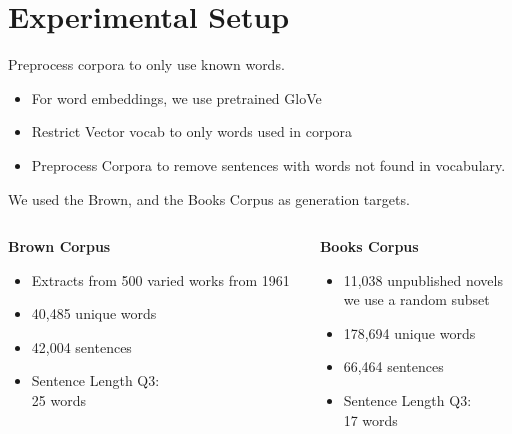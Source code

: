 \documentclass[]{beamer}
\begin{document}
\section{Experimental Setup}

\begin{frame}{Preprocess corpora to only use known words.}
	\begin{itemize}
		\item<1-> For word embeddings, we use pretrained GloVe 
		\item<2-> Restrict Vector vocab to only words used in corpora
		\item<2-> Preprocess Corpora to remove sentences with words not found in vocabulary.
	\end{itemize}
\end{frame}

\begin{frame}{We used the Brown, and the Books Corpus as generation targets.}
	\pause
	\begin{columns}[T]
		\begin{column}{0.5\textwidth}
			\textbf{\textcolor{darkbrown}{Brown Corpus}}
			\begin{itemize}
				\item Extracts from 500 varied works from 1961
				\item 40,485 unique words
				\item 42,004 sentences
				\item Sentence Length Q3: \\\hfill 25 words
			\end{itemize} 
		\end{column}
		\begin{column}{0.5\textwidth}
			\pause
			\textbf{\textcolor{darkbrown}{Books Corpus}}
			\begin{itemize}
				\item 11,038 unpublished novels\\we use a random subset
				\item 178,694 unique words
				\item 66,464 sentences 
				\item Sentence Length Q3: \\\hfill 17 words
			\end{itemize}
		\end{column}
	\end{columns}

\end{frame}
\end{document}
